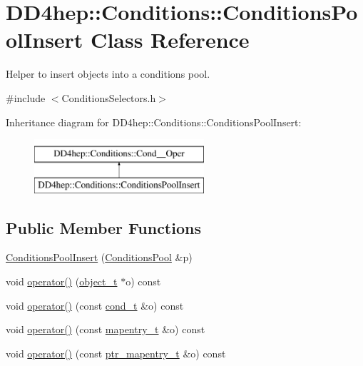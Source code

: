 \hypertarget{class_d_d4hep_1_1_conditions_1_1_conditions_pool_insert}{}\section{D\+D4hep\+:\+:Conditions\+:\+:Conditions\+Pool\+Insert Class Reference}
\label{class_d_d4hep_1_1_conditions_1_1_conditions_pool_insert}


Helper to insert objects into a conditions pool.  




{\ttfamily \#include $<$Conditions\+Selectors.\+h$>$}

Inheritance diagram for D\+D4hep\+:\+:Conditions\+:\+:Conditions\+Pool\+Insert\+:\begin{figure}[H]
\begin{center}
\leavevmode
\includegraphics[height=2.000000cm]{class_d_d4hep_1_1_conditions_1_1_conditions_pool_insert}
\end{center}
\end{figure}
\subsection*{Public Member Functions}
\begin{DoxyCompactItemize}
\item 
\hyperlink{class_d_d4hep_1_1_conditions_1_1_conditions_pool_insert_aab6b0dc7865e247803d2ba6e37ef403d}{Conditions\+Pool\+Insert} (\hyperlink{class_d_d4hep_1_1_conditions_1_1_conditions_pool}{Conditions\+Pool} \&p)
\item 
void \hyperlink{class_d_d4hep_1_1_conditions_1_1_conditions_pool_insert_a197dc9c63b9ed4cebd2d8bc852584881}{operator()} (\hyperlink{class_d_d4hep_1_1_conditions_1_1_cond_____oper_a4229491e49bfd21058dff10125a73f63}{object\+\_\+t} $\ast$o) const
\item 
void \hyperlink{class_d_d4hep_1_1_conditions_1_1_conditions_pool_insert_a8dd7e9d5a5f0c593ee2fc1df9e37b9b2}{operator()} (const \hyperlink{class_d_d4hep_1_1_conditions_1_1_cond_____oper_aceca9f6a0e8c84364946eace47275d09}{cond\+\_\+t} \&o) const
\item 
void \hyperlink{class_d_d4hep_1_1_conditions_1_1_conditions_pool_insert_aaf1f6d30abd4d82d50b23f326feb7922}{operator()} (const \hyperlink{class_d_d4hep_1_1_conditions_1_1_cond_____oper_a877dac3da66795207aed15be219acbdc}{mapentry\+\_\+t} \&o) const
\item 
void \hyperlink{class_d_d4hep_1_1_conditions_1_1_conditions_pool_insert_a4b947b6b213d05d4d84c9a36c6344a69}{operator()} (const \hyperlink{class_d_d4hep_1_1_conditions_1_1_cond_____oper_a0949e4bd5f90cd3fae2394cf30983973}{ptr\+\_\+mapentry\+\_\+t} \&o) const
\end{DoxyCompactItemize}
